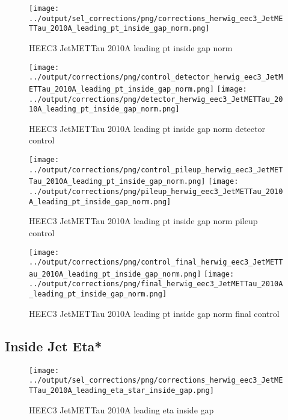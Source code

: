 \documentclass[11pt]{book}
\begin{document}
\begin{figure}[ht]
\centering
\texttt{[image: ../output/sel\_corrections/png/corrections\_herwig\_eec3\_JetMETTau\_2010A\_leading\_pt\_inside\_gap\_norm.png]}
\caption{HEEC3 JetMETTau 2010A leading pt inside gap norm}
\label{fig:HEEC3_JetMETTau_2010A_leading_pt_inside_gap_norm}
\end{figure}

\begin{figure}[ht]
\centering
\texttt{[image: ../output/corrections/png/control\_detector\_herwig\_eec3\_JetMETTau\_2010A\_leading\_pt\_inside\_gap\_norm.png]}
\texttt{[image: ../output/corrections/png/detector\_herwig\_eec3\_JetMETTau\_2010A\_leading\_pt\_inside\_gap\_norm.png]}
\caption{HEEC3 JetMETTau 2010A leading pt inside gap norm detector control}
\label{fig:HEEC3_JetMETTau_2010A_leading_pt_inside_gap_norm_detector_control}
\end{figure}

\begin{figure}[ht]
\centering
\texttt{[image: ../output/corrections/png/control\_pileup\_herwig\_eec3\_JetMETTau\_2010A\_leading\_pt\_inside\_gap\_norm.png]}
\texttt{[image: ../output/corrections/png/pileup\_herwig\_eec3\_JetMETTau\_2010A\_leading\_pt\_inside\_gap\_norm.png]}
\caption{HEEC3 JetMETTau 2010A leading pt inside gap norm pileup control}
\label{fig:HEEC3_JetMETTau_2010A_leading_pt_inside_gap_norm_pileup_control}
\end{figure}


\begin{figure}[ht]
\centering
\texttt{[image: ../output/corrections/png/control\_final\_herwig\_eec3\_JetMETTau\_2010A\_leading\_pt\_inside\_gap\_norm.png]}
\texttt{[image: ../output/corrections/png/final\_herwig\_eec3\_JetMETTau\_2010A\_leading\_pt\_inside\_gap\_norm.png]}
\caption{HEEC3 JetMETTau 2010A leading pt inside gap norm final control}
\label{fig:HEEC3_JetMETTau_2010A_leading_pt_inside_gap_norm_final_control}
\end{figure}


\clearpage
\subsection{Inside Jet Eta*}
\begin{figure}[ht]
\centering
\texttt{[image: ../output/sel\_corrections/png/corrections\_herwig\_eec3\_JetMETTau\_2010A\_leading\_eta\_star\_inside\_gap.png]}
\caption{HEEC3 JetMETTau 2010A leading eta inside gap}
\label{fig:HEEC3_JetMETTau_2010A_leading_eta_star_inside_gap}
\end{figure}
\end{document}
